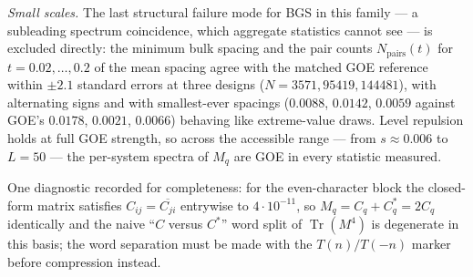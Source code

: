 \emph{Small scales.}  The last structural failure mode for BGS in this family
--- a subleading spectrum coincidence, which aggregate statistics cannot see ---
is excluded directly: the minimum bulk spacing and the pair counts
$N_{\mathrm{pairs}}(t)$ for $t=0.02,\dots,0.2$ of the mean spacing agree with the
matched GOE reference within $\pm2.1$ standard errors at three designs
($N=3571, 95419, 144481$), with alternating signs and with smallest-ever
spacings ($0.0088$, $0.0142$, $0.0059$ against GOE's $0.0178$, $0.0021$,
$0.0066$) behaving like extreme-value draws.  Level repulsion holds at full GOE
strength, so across the accessible range --- from $s\approx0.006$ to $L=50$ ---
the per-system spectra of $M_q$ are GOE in every statistic measured.

One diagnostic recorded for completeness: for the even-character block the
closed-form matrix satisfies $C_{ij}=\overline{C_{ji}}$ entrywise to
$4\cdot10^{-11}$, so $M_q=C_q+C_q^{*}=2C_q$ identically and the naive
``$C$ versus $C^{*}$'' word split of $\operatorname{Tr}(M^4)$ is degenerate in
this basis; the word separation must be made with the $T(n)/T(-n)$ marker before
compression instead.

